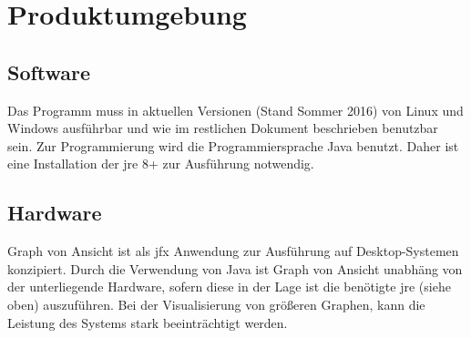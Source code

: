 \chapter{Produktumgebung}

\section{Software}
Das Programm muss in aktuellen Versionen (Stand Sommer 2016) von Linux und Windows ausführbar und wie im restlichen Dokument beschrieben benutzbar sein.
Zur Programmierung wird die Programmiersprache Java benutzt. Daher ist eine Installation der \gls{jre} 8+ zur Ausführung notwendig.

\section{Hardware}
Graph von Ansicht ist als \gls{jfx} Anwendung zur Ausführung auf Desktop-Systemen konzipiert.
Durch die Verwendung von Java ist Graph von Ansicht unabhäng von der unterliegende Hardware, sofern diese in der Lage ist die benötigte \gls{jre} (siehe oben) auszuführen.
Bei der Visualisierung von größeren Graphen, kann die Leistung des Systems stark beeinträchtigt werden.

